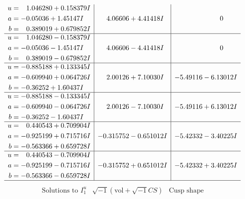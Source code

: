 \documentclass[1p]{elsarticle_modified}
\theoremstyle{definition}
\newcommand{\I}{\sqrt{-1}}
\begin{document}
$$\begin{array}{c|c|c}
\begin{aligned}
u &= \phantom{-}1.046280 + 0.158379 I \\
a &= -0.05036 + 1.45147 I \\
b &= \phantom{-}0.389019 + 0.679852 I\end{aligned}
 & \phantom{-}4.06606 + 4.41418 I & \phantom{-0.000000 } 0 \\ \hline\begin{aligned}
u &= \phantom{-}1.046280 - 0.158379 I \\
a &= -0.05036 - 1.45147 I \\
b &= \phantom{-}0.389019 - 0.679852 I\end{aligned}
 & \phantom{-}4.06606 - 4.41418 I & \phantom{-0.000000 } 0 \\ \hline\begin{aligned}
u &= -0.885188 + 0.133345 I \\
a &= -0.609940 + 0.064726 I \\
b &= -0.36252 + 1.60437 I\end{aligned}
 & \phantom{-}2.00126 + 7.10030 I & -5.49116 - 6.13012 I \\ \hline\begin{aligned}
u &= -0.885188 - 0.133345 I \\
a &= -0.609940 - 0.064726 I \\
b &= -0.36252 - 1.60437 I\end{aligned}
 & \phantom{-}2.00126 - 7.10030 I & -5.49116 + 6.13012 I \\ \hline\begin{aligned}
u &= \phantom{-}0.440543 + 0.709904 I \\
a &= -0.925199 + 0.715716 I \\
b &= -0.563366 + 0.659728 I\end{aligned}
 & -0.315752 - 0.651012 I & -5.42332 - 3.40225 I \\ \hline\begin{aligned}
u &= \phantom{-}0.440543 - 0.709904 I \\
a &= -0.925199 - 0.715716 I \\
b &= -0.563366 - 0.659728 I\end{aligned}
 & -0.315752 + 0.651012 I & -5.42332 + 3.40225 I\\
 \hline 
 \end{array}$$\newpage$$\begin{array}{c|c|c}  
\text{Solutions to }I^u_{1}& \I (\text{vol} + \sqrt{-1}CS) & \text{Cusp shape}\\
 \hline 
\begin{aligned}

\end{aligned}
\end{array}$$
\end{document}

